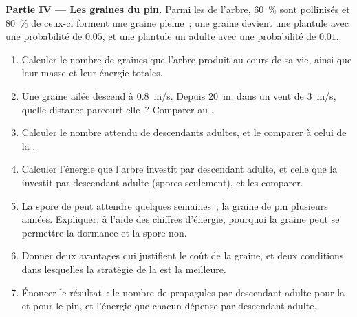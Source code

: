 \begin{problem}
\medskip
\noindent\textbf{Partie IV --- Les graines du pin.}
Parmi les  de l'arbre, \qty{60}{\%} sont pollinisés et
\qty{80}{\%} de ceux-ci forment une graine pleine~; une graine devient
une plantule avec une probabilité de $0.05$, et une plantule un adulte
avec une probabilité de $0.01$.
\begin{enumerate}[resume]
  \item Calculer le nombre de graines que l'arbre produit au cours de sa
        vie, ainsi que leur masse et leur énergie totales.
  \item Une graine ailée descend à \qty{0.8}{m/s}. Depuis \qty{20}{m},
        dans un vent de \qty{3}{m/s}, quelle distance parcourt-elle~?
        Comparer au .
  \item Calculer le nombre attendu de descendants adultes, et le
        comparer à celui de la .
  \item Calculer l'énergie que l'arbre investit par descendant adulte,
        et celle que la  investit par descendant adulte (spores
        seulement), et les comparer.
  \item La spore de  peut attendre quelques semaines~; la graine
        de pin plusieurs années. Expliquer, à l'aide des chiffres
        d'énergie, pourquoi la graine peut se permettre la dormance et
        la spore non.
  \item Donner deux avantages qui justifient le coût de la graine, et
        deux conditions dans lesquelles la stratégie de la  est la
        meilleure.
  \item Énoncer le résultat~: le nombre de propagules par descendant
        adulte pour la  et pour le pin, et l'énergie que chacun
        dépense par descendant adulte.
\end{enumerate}
\end{problem}
